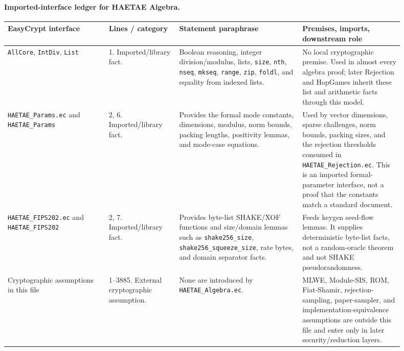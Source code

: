 \documentclass[11pt]{report}
\DeclareRobustCommand{\file}[1]{\ifmmode\text{\nolinkurl{#1}}\else\nolinkurl{#1}\fi}
\DeclareRobustCommand{\ec}[1]{\ifmmode\text{\nolinkurl{#1}}\else\nolinkurl{#1}\fi}
\theoremstyle{definition}
\theoremstyle{plain}
\begin{document}
\paragraph{Imported-interface ledger for HAETAE Algebra.}
{\footnotesize
\begin{longtable}{p{0.23\linewidth}p{0.16\linewidth}p{0.28\linewidth}p{0.23\linewidth}}
\toprule
\textbf{EasyCrypt interface} & \textbf{Lines / category} &
\textbf{Statement paraphrase} & \textbf{Premises, imports, downstream role} \\
\midrule
\ec{AllCore}, \ec{IntDiv}, \ec{List} &
1. Imported/library fact. &
Boolean reasoning, integer division/modulus, lists, \ec{size}, \ec{nth},
\ec{nseq}, \ec{mkseq}, \ec{range}, \ec{zip}, \ec{foldl}, and equality from
indexed lists. &
No local cryptographic premise.  Used in almost every algebra proof; later
Rejection and HopGames inherit these list and arithmetic facts through this
model. \\
\midrule
\file{HAETAE\_Params.ec} and \ec{HAETAE\_Params} &
2, 6. Imported/library fact. &
Provides the formal mode constants, dimensions, modulus, norm bounds, packing
lengths, positivity lemmas, and mode-case equations. &
Used by vector dimensions, sparse challenges, norm bounds, packing sizes, and
the rejection thresholds consumed in \file{HAETAE\_Rejection.ec}.  This is an
imported formal-parameter interface, not a proof that the constants match a
standard document. \\
\midrule
\file{HAETAE\_FIPS202.ec} and \ec{HAETAE\_FIPS202} &
2, 7. Imported/library fact. &
Provides byte-list SHAKE/XOF functions and size/domain lemmas such as
\ec{shake256\_size}, \ec{shake256\_squeeze\_size}, rate bytes, and domain
separator facts. &
Feeds keygen seed-flow lemmas.  It supplies deterministic byte-list facts, not
a random-oracle theorem and not SHAKE pseudorandomness. \\
\midrule
Cryptographic assumptions in this file &
1--3885. External cryptographic assumption. &
None are introduced by \file{HAETAE\_Algebra.ec}. &
MLWE, Module-SIS, ROM, Fiat-Shamir, rejection-sampling, paper-sampler, and
implementation-equivalence assumptions are outside this file and enter only in
later security/reduction layers. \\
\bottomrule
\end{longtable}
}
\end{document}
